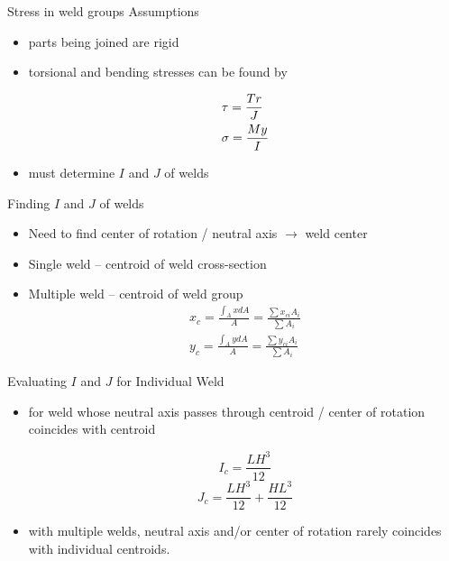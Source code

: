 \documentclass[10pt, svgnames]{beamer}
\begin{document}
\begin{frame}[label={sec:orgd2d71cf}]{Stress in weld groups}
Assumptions

  \begin{itemize}
  \item parts being joined are rigid
  \item torsional and bending stresses can be found by

    \[\begin{gathered}
        \tau  = \frac{{Tr}}{{{J}}} \hfill \\
        \sigma  = \frac{{My}}{I} \hfill \\ 
      \end{gathered} \]
    
  \item must determine $I$ and $J$ of welds
  
\end{itemize}
\end{frame}

\begin{frame}[label={sec:org463adad}]{Finding \(I\) and \(J\) of welds}
\begin{itemize}
  \item Need to find center of rotation / neutral axis $\rightarrow$ weld center
\item Single weld -- centroid of weld cross-section
\item Multiple weld -- centroid of weld group
  \begin{align*}
    x_c = \frac{\int_A xdA}{A} = \frac{\sum x_{ci}A_i}{\sum A_i} \\
    y_c = \frac{\int_A ydA}{A} = \frac{\sum y_{ci}A_i}{\sum A_i}
  \end{align*}
\end{itemize}
\end{frame}

\begin{frame}[label={sec:orgc219c2b}]{Evaluating \(I\) and \(J\) for Individual Weld}
  \begin{itemize}
  \item for weld whose neutral axis passes through centroid / center of rotation coincides with centroid
    
  $$ I_c = \frac{L H^3}{12} $$
  $$ J_c = \frac{L H^3}{12} + \frac{H L^3}{12} $$

\item with multiple welds, neutral axis and/or center of rotation rarely coincides with individual centroids.
\end{itemize}
\end{frame}
\end{document}
